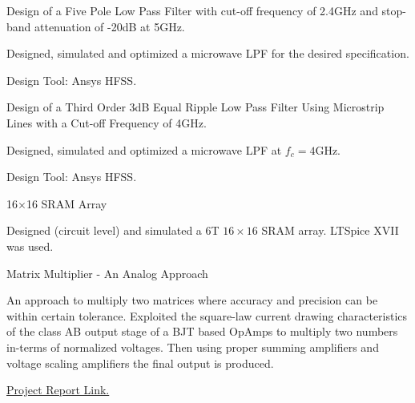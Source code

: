 \begin{cventries}

  \cventry
    {Design of a Five Pole Low Pass Filter with cut-off frequency of 2.4GHz and stop-band attenuation of -20dB at 5GHz.} %
    {} %
    {} %
    {} %
    {
      \begin{cvitems} %
        \item {Designed, simulated and optimized a microwave LPF for the desired specification.}
        \item {Design Tool: Ansys HFSS.}
      \end{cvitems}
    }

  \cventry
    {Design of a Third Order 3dB Equal Ripple Low Pass Filter Using Microstrip Lines with a Cut-off Frequency of 4GHz.} %
    {} %
    {} %
    {} %
    {
      \begin{cvitems} %
        \item {Designed, simulated and optimized a microwave LPF at $f_c=4$GHz.}
        \item {Design Tool: Ansys HFSS.}
      \end{cvitems}
    }


  \cventry
    {16$\times$16 SRAM Array} %
    {} %
    {} %
    {} %
    {
      \begin{cvitems} %
        \item {Designed (circuit level) and simulated a 6T $16\times16$ SRAM array. LTSpice XVII was used.}
      \end{cvitems}
    }


  \cventry
    {Matrix Multiplier - An Analog Approach} %
    {} %
    {} %
    {} %
    {
      \begin{cvitems} %
        \item {An approach to multiply two matrices where accuracy and precision can be within certain tolerance. Exploited the square-law current drawing characteristics of the class AB output stage of a BJT based OpAmps to multiply two numbers in-terms of normalized voltages. Then using proper summing amplifiers and voltage scaling amplifiers the final output is produced.}
        \item {\href{https://github.com/DhimanSarkar/BTech-Major-Project/raw/master/BTech Major Project/report.pdf}{Project Report Link.}}
      \end{cvitems}
    }


\end{cventries}
